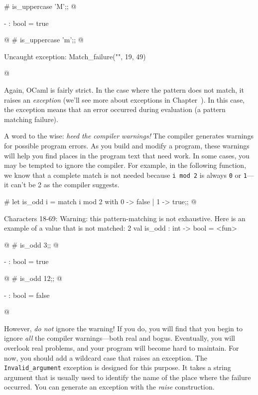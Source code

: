 \begin{ocaml}
# is_uppercase 'M';;
@
\begin{topoutput}
- : bool = true
\end{topoutput}
@
# is_uppercase 'm';;
@
\begin{toperror}
Uncaught exception: Match_failure("", 19, 49)
\end{toperror}
@
\end{ocaml}
%
Again, OCaml is fairly strict.  In the case where the pattern does not
match, it raises an \emph{exception} (we'll see more about exceptions
in Chapter~).  In this case, the exception
means that an error occurred during evaluation (a pattern matching
failure).

A word to the wise: \emph{heed the compiler warnings!}  The compiler
generates warnings for possible program errors.  As you build and
modify a program, these warnings will help you find places in the
program text that need work.  In some cases, you may be tempted to
ignore the compiler.  For example, in the following function, we know
that a complete match is not needed because \hbox{\lstinline/i mod 2/}
is always \hbox{\lstinline/0/} or \hbox{\lstinline/1/}---it can't be 2
as the compiler suggests.

\begin{ocaml}
# let is_odd i =
     match i mod 2 with
        0 -> false
      | 1 -> true;;
@
\begin{toperror}
Characters 18-69:
Warning: this pattern-matching is not exhaustive.
Here is an example of a value that is not matched:
2
val is_odd : int -> bool = <fun>
\end{toperror}
@
# is_odd 3;;
@
\begin{topoutput}
- : bool = true
\end{topoutput}
@
# is_odd 12;;
@
\begin{topoutput}
- : bool = false
\end{topoutput}
@
\end{ocaml}
%
However, \emph{do not} ignore the warning!  If you do, you will find
that you begin to ignore \emph{all} the compiler warnings---both real
and bogus.  Eventually, you will overlook real problems, and your
program will become hard to maintain.  For now, you should add a
wildcard case that raises an exception.  The
\hbox{\lstinline/Invalid_argument/} exception is designed for this purpose.  It
takes a string argument that is usually used to identify the name of
the place where the failure occurred.  You can generate an exception
with the \emph{raise} construction.

